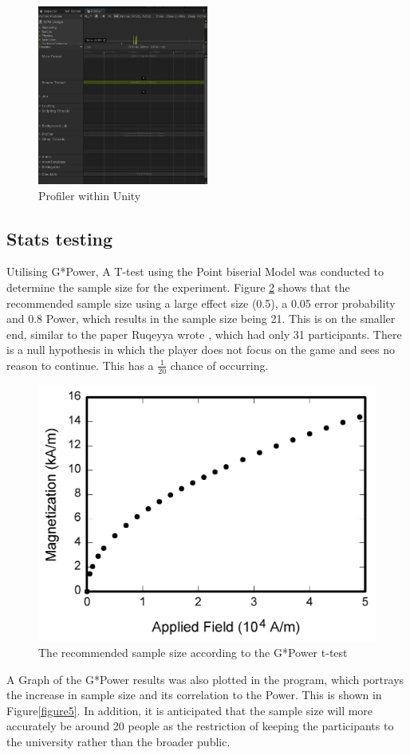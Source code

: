 \documentclass[conference]{IEEEtran}
\begin{document}
\begin{figure}[H]
\begin{center}
\includegraphics[width = 0.5\textwidth, ]{Profiler}
\caption{Profiler within Unity}
\label{Profiler}
\end{center}
\end{figure}

\subsection{Stats testing}
Utilising G*Power, A T-test using the Point biserial Model was conducted to determine the sample size for the experiment. Figure \ref{figure4} shows that the recommended sample size using a large effect size (0.5), a 0.05 error probability and 0.8 Power, which results in the sample size being 21. This is on the smaller end, similar to the paper Ruqeyya wrote \cite{Ruqeyya2022}, which had only 31 participants. There is a null hypothesis in which the player does not focus on the game and sees no reason to continue. This has a \(\frac{1}{20}\) chance of occurring.
\begin{figure}[H]
\includegraphics[width =0.5 \textwidth]{fig1}
\caption{The recommended sample size according to the G*Power t-test}
\label{figure4}
\end{figure}

A Graph of the G*Power results was also plotted in the program, which portrays the increase in sample size and its correlation to the Power. This is shown in Figure\ref{figure5}. In addition, it is anticipated that the sample size will more accurately be around 20 people as the restriction of keeping the participants to the university rather than the broader public. 
\end{document}
